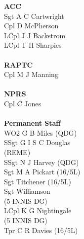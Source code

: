 \begin{multicols}{3}
  \textbf{ACC} \\
  Sgt A C Cartwright \\
  Cpl D McPherson \\
  LCpl J J Backstrom \\
  LCpl T H Sharpies \\
  \\
  \textbf{RAPTC} \\
  Cpl M J Manning \\
  \\
  \textbf{NPRS} \\
  Cpl C Jones \\
  \\
  \textbf{Permanent Staff} \\
  WO2 G B Miles (QDG) \\
  SSgt G I S C Douglas \\ \indent (REME) \\
  SSgt N J Harvey (QDG) \\
  Sgt M A Pickart (16/5L) \\
  Sgt Titchener (16/5L) \\
  Sgt Williamson \\ \indent (5 INNIS DG) \\
  LCpl K G Nightingale \\ \indent (5 INNIS DG) \\
  Tpr C R Davies (16/5L) \\
\end{multicols}
